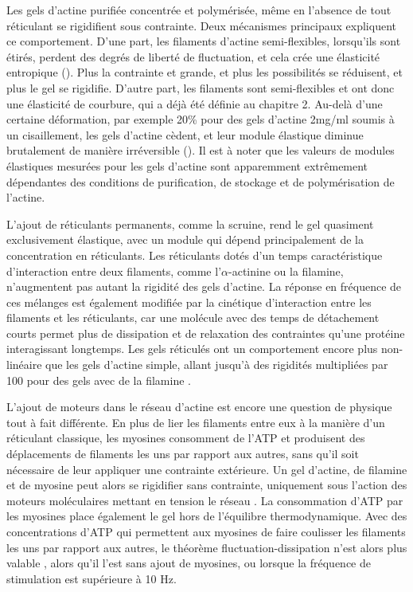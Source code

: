 Les gels d'actine purifiée concentrée et polymérisée, même en l'absence de tout réticulant se rigidifient sous contrainte. Deux mécanismes principaux expliquent ce comportement. 
D'une part, les filaments d'actine semi-flexibles, lorsqu'ils sont étirés, perdent des degrés de liberté de fluctuation, et cela crée une élasticité entropique (\cite{storm_nonlinear_2005}). Plus la contrainte et grande, et plus les possibilités se réduisent, et plus le gel se rigidifie. 
D'autre part, les filaments sont semi-flexibles et ont donc une élasticité de courbure, qui a déjà été définie au chapitre 2. 
Au-delà d'une certaine déformation, par exemple 20\% pour des gels d'actine 2mg/ml soumis à un cisaillement, les gels d'actine cèdent, et leur module élastique diminue brutalement de manière irréversible (\cite{janmey_mechanical_1994}).
Il est à noter que les valeurs de modules élastiques mesurées pour les gels d'actine sont apparemment extrêmement dépendantes des conditions de purification, de stockage et de polymérisation de l'actine. 

L'ajout de réticulants permanents, comme la scruine, rend le gel quasiment exclusivement élastique, avec un module qui dépend principalement de la concentration en réticulants. 
Les réticulants dotés d'un temps caractéristique d'interaction entre deux filaments, comme l'$\alpha$-actinine ou la filamine, n'augmentent pas autant la rigidité des gels d'actine. 
La réponse en fréquence de ces mélanges est également modifiée par la cinétique d'interaction entre les filaments et les réticulants, car une molécule avec des temps de détachement courts permet plus de dissipation et de relaxation des contraintes qu'une protéine interagissant longtemps. 
Les gels réticulés ont un comportement encore plus non-linéaire que les gels d'actine simple, allant jusqu'à des rigidités multipliées par 100 pour des gels avec de la filamine \parencite{gardel_stress-dependent_2006}. 

L'ajout de moteurs dans le réseau d'actine est encore une question de physique tout à fait différente. En plus de lier les filaments entre eux à la manière d'un réticulant classique, les myosines consomment de l'ATP et produisent des déplacements de filaments les uns par rapport aux autres, sans qu'il soit nécessaire de leur appliquer une contrainte extérieure. 
Un gel d'actine, de filamine et de myosine peut alors se rigidifier sans contrainte, uniquement sous l'action des moteurs moléculaires mettant en tension le réseau \parencite{koenderink_active_2009}. 
La consommation d'ATP par les myosines place également le gel hors de l'équilibre thermodynamique. 
Avec des concentrations d'ATP qui permettent aux myosines de faire coulisser les filaments les uns par rapport aux autres, le théorème fluctuation-dissipation n'est alors plus valable \parencite{mizuno_nonequilibrium_2007}, alors qu'il l'est sans ajout de myosines, ou lorsque la fréquence de stimulation est supérieure à 10 Hz. 



